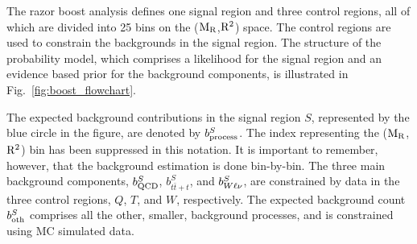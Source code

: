 

The razor boost analysis defines one signal region and three control regions, all of which are
divided into 25 bins on the ($\mathrm{M_R}$,$\mathrm{R^2}$) space. The control regions are used to constrain the
backgrounds in the signal region.
The structure of the probability model, which comprises a likelihood for the signal
region and an evidence based prior for the background components, is illustrated in
Fig.~\ref{fig:boost_flowchart}. 

The expected background contributions in the signal region $S$, represented by the blue circle in
the figure, are denoted by $b^S_{\rm process}$. The index representing the ($\mathrm{M_R}$,$\mathrm{R^2}$) bin has
been suppressed in this notation. It is important to remember, however, that the background
estimation is done bin-by-bin.  
The three main background components, $b^S_{\rm QCD}$, $b^S_{t\bar{t}+t}$, and $b^S_{W\ell\nu}$,
are constrained by data in the three control regions, $Q$, $T$, and $W$, respectively. 
The expected background count $b_{\rm oth}^S$ comprises all the other, smaller, background
processes, and is constrained using MC simulated data. 

